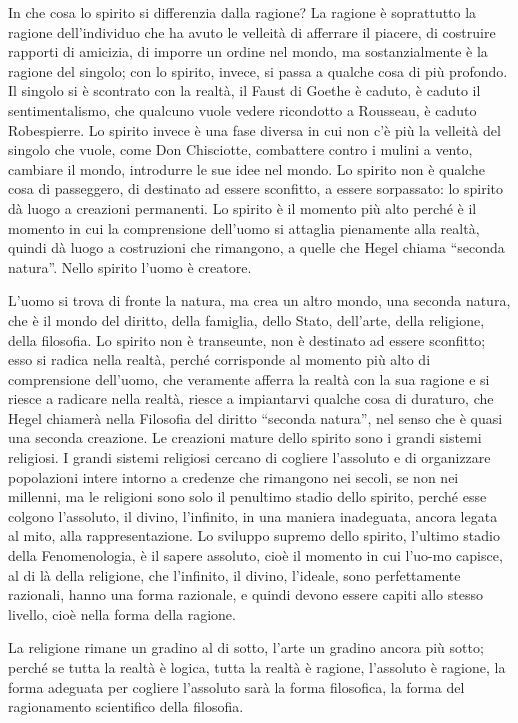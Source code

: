 \documentclass[a4paper,12pt,oneside,openany]{book}%
\begin{document}
In che cosa lo spirito si differenzia dalla ragione? La ragione è soprattutto la ragione dell’individuo che ha avuto le velleità di afferrare il piacere, di costruire rapporti di amicizia, di imporre un ordine nel mondo, ma sostanzialmente è la ragione del singolo; con lo spirito, invece, si passa a qualche cosa di più profondo. Il singolo si è scontrato con la realtà, il Faust di Goethe è caduto, è caduto il sentimentalismo, che qualcuno vuole vedere ricondotto a Rousseau, è caduto Robespierre. Lo spirito invece è una fase diversa in cui non c’è più la velleità del singolo che vuole, come Don Chisciotte, combattere contro i mulini a vento, cambiare il mondo, introdurre le sue idee nel mondo. Lo spirito non è qualche cosa di passeggero, di destinato ad essere sconfitto, a essere sorpassato: lo spirito dà luogo a creazioni permanenti. Lo spirito è il momento più alto perché è il momento in cui la comprensione dell’uomo si attaglia pienamente alla realtà, quindi dà luogo a costruzioni che rimangono, a quelle che Hegel chiama “seconda natura”. Nello spirito l’uomo è creatore.

L’uomo si trova di fronte la natura, ma crea un altro mondo, una seconda natura, che è il mondo del diritto, della famiglia, dello Stato, dell’arte, della religione, della filosofia. Lo spirito non è transeunte, non è destinato ad essere sconfitto; esso si radica nella realtà, perché corrisponde al momento più alto di comprensione dell’uomo, che veramente afferra la realtà con la sua ragione e si riesce a radicare nella realtà, riesce a impiantarvi qualche cosa di duraturo, che Hegel chiamerà nella Filosofia del diritto “seconda natura”, nel senso che è quasi una seconda creazione. Le creazioni mature dello spirito sono i grandi sistemi religiosi. I grandi sistemi religiosi cercano di cogliere l’assoluto e di organizzare popolazioni intere intorno a credenze che rimangono nei secoli, se non nei millenni, ma le religioni sono solo il penultimo stadio dello spirito, perché esse colgono l’assoluto, il divino, l’infinito, in una maniera inadeguata, ancora legata al mito, alla rappresentazione. Lo sviluppo supremo dello spirito, l’ultimo stadio della Fenomenologia, è il sapere assoluto, cioè il momento in cui l’uo-mo capisce, al di là della religione, che l’infinito, il divino, l’ideale, sono perfettamente razionali, hanno una forma razionale, e quindi devono essere capiti allo stesso livello, cioè nella forma della ragione.

La religione rimane un gradino al di sotto, l’arte un gradino ancora più sotto; perché se tutta la realtà è logica, tutta la realtà è ragione, l’assoluto è ragione, la forma adeguata per cogliere l’assoluto sarà la forma filosofica, la forma del ragionamento scientifico della filosofia.
\end{document}
